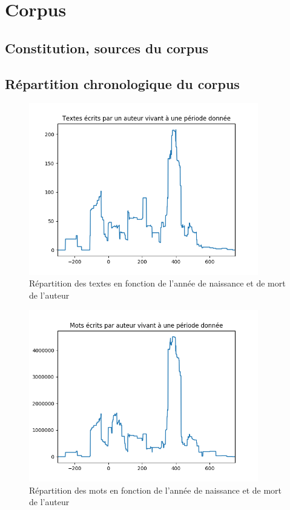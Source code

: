 

\section{Corpus}
\label{sec:corpus}

\subsection{Constitution, sources du corpus}
\label{subsec:corpus_constitution}

\subsection{Répartition chronologique du corpus}
\label{subsec:corpus_chrono}

\begin{figure}[h]
    \centering
    \includegraphics[width=10cm]{../results/analysis/corpus_analysis/texts_per_year.png}
    \caption{Répartition des textes en fonction de l'année de naissance et de mort de l'auteur}
    \label{texts_per_year}
\end{figure}

\begin{figure}[h]
    \centering
    \includegraphics[width=10cm]{../results/analysis/corpus_analysis/tokens_per_year.png}
    \caption{Répartition des mots en fonction de l'année de naissance et de mort de l'auteur}
    \label{tokens_per_year}
\end{figure}

